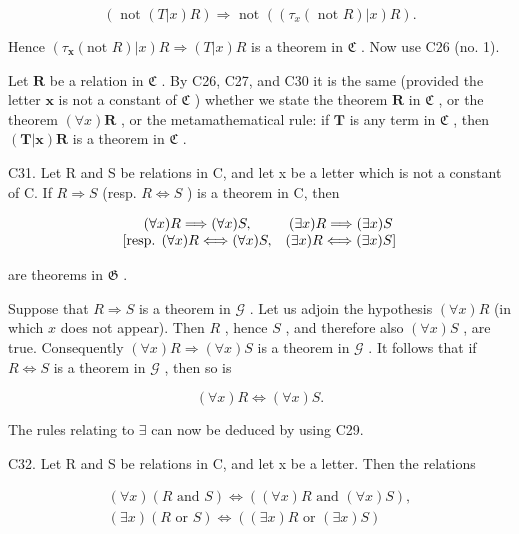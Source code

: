 \[
(\text { not } (T | x) R) \Longrightarrow \text { not } ((\tau_ {x} (\text { not } R) | x) R).
\]

Hence \((\tau_{\mathbf{x}}(\text{not } R)|x)R \Longrightarrow (T|x)R\) is a theorem in \(\mathfrak{C}\) . Now use C26 (no. 1).

Let \(\pmb{R}\) be a relation in \(\mathfrak{C}\) . By C26, C27, and C30 it is the same (provided the letter \(\pmb{x}\) is not a constant of \(\mathfrak{C}\) ) whether we state the theorem \(\pmb{R}\) in \(\mathfrak{C}\) , or the theorem \((\forall x)\pmb{R}\) , or the metamathematical rule: if \(\pmb{T}\) is any term in \(\mathfrak{C}\) , then \((\pmb{T}|\pmb{x})\pmb{R}\) is a theorem in \(\mathfrak{C}\) .

C31. Let R and S be relations in C, and let x be a letter which is not a constant of C. If \(R \Longrightarrow S\) (resp. \(R \Longleftrightarrow S\) ) is a theorem in C, then

\[
\begin{array}{c c} (\forall x) R \Longrightarrow (\forall x) S, & (\exists x) R \Longrightarrow (\exists x) S \\ \text{[resp. } (\forall x) R \Longleftrightarrow (\forall x) S, & (\exists x) R \Longleftrightarrow (\exists x) S \text{]} \end{array}
\]

are theorems in \(\mathfrak{G}\) .

Suppose that \(R \Longrightarrow S\) is a theorem in \(\mathcal{G}\) . Let us adjoin the hypothesis \((\forall x)R\) (in which \(x\) does not appear). Then \(R\) , hence \(S\) , and therefore also \((\forall x)S\) , are true. Consequently \((\forall x)R \Longrightarrow (\forall x)S\) is a theorem in \(\mathcal{G}\) . It follows that if \(R \Longleftrightarrow S\) is a theorem in \(\mathcal{G}\) , then so is

\[
(\forall x) R \Longleftrightarrow (\forall x) S.
\]

The rules relating to \(\exists\) can now be deduced by using C29.

C32. Let R and S be relations in C, and let x be a letter. Then the relations

\[
\begin{array}{l} (\forall x) (R \text {   and   } S) \iff ((\forall x) R \text {   and   } (\forall x) S), \\ (\exists x) (R \text {   or   } S) \iff ((\exists x) R \text {   or   } (\exists x) S) \end{array}
\]

